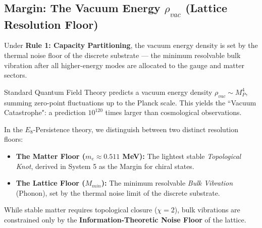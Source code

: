\subsection{Margin: The Vacuum Energy \texorpdfstring{$\rho_{vac}$}{rhovac} (Lattice Resolution Floor)}
\label{sec:vacuum_energy}

Under \textbf{Rule 1: Capacity Partitioning}, the vacuum energy density is set by the thermal noise floor of the discrete substrate — the minimum resolvable bulk vibration after all higher-energy modes are allocated to the gauge and matter sectors.

Standard Quantum Field Theory predicts a vacuum energy density $\rho_{vac} \sim M_P^4$, summing zero-point fluctuations up to the Planck scale. This yields the ``Vacuum Catastrophe": a prediction $10^{120}$ times larger than cosmological observations.

In the $E_8$-Persistence theory, we distinguish between two distinct resolution floors:
\begin{itemize}
    \item \textbf{The Matter Floor ($m_e \approx 0.511$ MeV):} The lightest stable \emph{Topological Knot}, derived in System 5 as the Margin for chiral states.
    \item \textbf{The Lattice Floor ($M_{min}$):} The minimum resolvable \emph{Bulk Vibration} (Phonon), set by the thermal noise limit of the discrete substrate.
\end{itemize}

While stable matter requires topological closure ($\chi = 2$), bulk vibrations are constrained only by the \textbf{Information-Theoretic Noise Floor} of the lattice.

